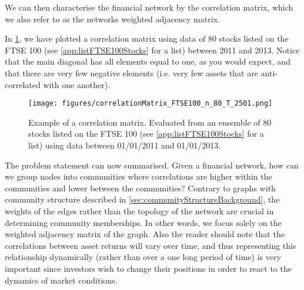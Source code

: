 We can then characterise the financial network by the correlation matrix, which we also refer to as the networks weighted adjacency matrix.

In \cref{fig:exampleCrossCorrelationMatrix}, we have plotted a correlation matrix using data of 80 stocks listed on the FTSE 100 (see \cref{app:listFTSE100Stocks} for a list) between 2011 and 2013. Notice that the main diagonal has all elements equal to one, as you would expect, and that there are very few negative elements (i.e. very few assets that are anti-correlated with one another).

\begin{figure}
	\centering
	\texttt{[image: figures/correlationMatrix\_FTSE100\_n\_80\_T\_2501.png]}
	\caption[Example plot for a correlation matrix]{\label{fig:exampleCrossCorrelationMatrix} Example of a correlation matrix. Evaluated from an ensemble of 80 stocks listed on the FTSE 100 (see \cref{app:listFTSE100Stocks} for a list) using data between 01/01/2011 and 01/01/2013.}
\end{figure}

The problem statement can now summarised.
Given a financial network, how can we group nodes into communities where correlations are higher within the communities and lower between the communities?
Contrary to graphs with community structure described in \cref{sec:communityStructureBackground}, the weights of the edges rather than the topology of the network are crucial in determining community memberships.
In other words, we focus solely on the weighted adjacency matrix of the graph.
Also the reader should note that the correlations between asset returns will vary over time, and thus representing this relationship dynamically (rather than over a one long period of time) is very important since investors wish to change their positions in order to react to the dynamics of market conditions.
